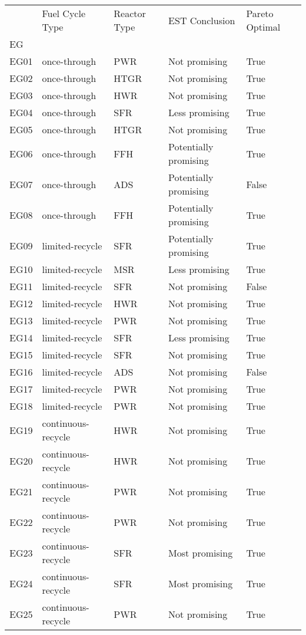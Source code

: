 \begin{tabular}{lllll}
\toprule
 & Fuel Cycle Type & Reactor Type & EST Conclusion & Pareto Optimal \\
EG &  &  &  &  \\
\midrule
EG01 & once-through & PWR & Not promising & True \\
EG02 & once-through & HTGR & Not promising & True \\
EG03 & once-through & HWR & Not promising & True \\
EG04 & once-through & SFR & Less promising & True \\
EG05 & once-through & HTGR & Not promising & True \\
EG06 & once-through & FFH & Potentially promising & True \\
EG07 & once-through & ADS & Potentially promising & False \\
EG08 & once-through & FFH & Potentially promising & True \\
EG09 & limited-recycle & SFR & Potentially promising & True \\
EG10 & limited-recycle & MSR & Less promising & True \\
EG11 & limited-recycle & SFR & Not promising & False \\
EG12 & limited-recycle & HWR & Not promising & True \\
EG13 & limited-recycle & PWR & Not promising & True \\
EG14 & limited-recycle & SFR & Less promising & True \\
EG15 & limited-recycle & SFR & Not promising & True \\
EG16 & limited-recycle & ADS & Not promising & False \\
EG17 & limited-recycle & PWR & Not promising & True \\
EG18 & limited-recycle & PWR & Not promising & True \\
EG19 & continuous-recycle & HWR & Not promising & True \\
EG20 & continuous-recycle & HWR & Not promising & True \\
EG21 & continuous-recycle & PWR & Not promising & True \\
EG22 & continuous-recycle & PWR & Not promising & True \\
EG23 & continuous-recycle & SFR & Most promising & True \\
EG24 & continuous-recycle & SFR & Most promising & True \\
EG25 & continuous-recycle & PWR & Not promising & True \\

\end{tabular}
